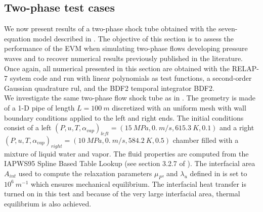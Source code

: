 \documentclass{inputs/mc2015}
\begin{document}
\subsection{Two-phase test cases} \label{sec:2-phase-problems}
%
We now present results of a two-phase shock tube obtained with the seven-equation model described in . %
The objective of this section is to assess the performance of the EVM when simulating two-phase flows developing pressure waves and to recover numerical results previously published in the literature. Once again, all numerical presented in this section are obtained with the RELAP-7 system code and run with linear polynomials as test functions, a second-order Gaussian quadrature rul, and the BDF2 temporal integrator BDF2. \\
We investigate the same two-phase flow shock tube as in \cite{Sokolowski-Koszela, waha-manual}. The geometry is made of a 1-D pipe of length $L = 100\ m$ discretized with an uniform mesh with wall boundary conditions applied to the left and right ends. The initial conditions consist of a left $(P, u, T, \alpha_{vap})_{left} = (15 \ MPa, 0. \ m/s, 615.3 \ K, 0.1)$ and a right $(P, u, T, \alpha_{vap})_{right} = (10 \ MPa, 0. \ m/s, 584.2 \ K, 0.5)$ chamber filled with a mixture of liquid water and vapor. The fluid properties are computed from the IAPWS95 Spline Based Table Lookup (see section 3.2.7 of \cite{Berry_Peterson_2014}). The interfacial area $A_{int}$ used to compute the relaxation parameters $\mu_P$, and $\lambda_u$ defined in  is set to $10^6 \ m^{-1}$ which ensures mechanical equilibrium. The interfacial heat transfer is turned on in this test and because of the very large interfacial area, thermal equilibrium is also achieved.
\end{document}
